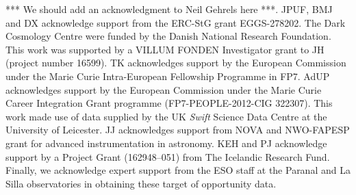 \documentclass{aa}    %
\begin{document}
\begin{acknowledgements}
	*** We should add an acknowledgment to Neil Gehrels here ***. JPUF, BMJ and DX
acknowledge support from the ERC-StG grant EGGS-278202. The Dark Cosmology
Centre were funded by the Danish National Research Foundation. This work was
supported by a VILLUM FONDEN Investigator grant to JH (project number 16599).
TK acknowledges support by the European Commission under the Marie Curie
Intra-European Fellowship Programme in FP7.  AdUP acknowledges support by the
European Commission under the Marie Curie Career Integration Grant programme
(FP7-PEOPLE-2012-CIG 322307).  This work made use of data supplied by the UK
{\it Swift} Science Data Centre at the University of Leicester. JJ acknowledges
support from NOVA and NWO-FAPESP grant for advanced instrumentation in
astronomy. KEH and PJ acknowledge support by a Project Grant (162948--051) from
The Icelandic Research Fund. Finally, we acknowledge expert support from the
ESO staff at the Paranal and La Silla observatories in obtaining these target
of opportunity data.
	
\end{acknowledgements}






\clearpage
\end{document}
